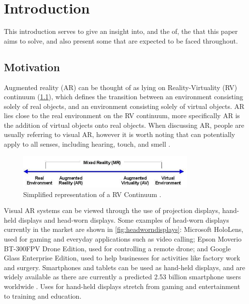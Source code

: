 
\chapter{Introduction}\label{chap:introduction}

This introduction serves to give an insight into, and the  of, the  that this paper aims to solve, and also present some  that are expected to be faced throughout.

\section{Motivation}\label{sec:motivation}

Augmented reality (AR) can be thought of as lying on  Reality-Virtuality (RV) continuum (\cref{fig:continuum}), which defines the transition between an environment consisting solely of real objects, and an environment consisting solely of virtual objects.  AR lies close to the real environment on the RV continuum, more specifically AR is the addition of virtual objects onto real objects. When discussing AR, people are usually referring to visual AR, however it is worth noting that can potentially apply to all senses, including hearing, touch, and smell \citep{aradvances}.

\begin{figure}[ht]
    \centering
    \includegraphics[width=0.8\textwidth]{images/proposal/RealityVirtualityContinuum}
    \caption{Simplified representation of a RV Continuum \protect\citep{rvcontinuum}.}
    \label{fig:continuum}
\end{figure}

Visual AR systems can be viewed through the use of projection displays, hand-held displays and head-worn displays. Some examples of head-worn displays currently in the market are shown in \cref{fig:headworndisplays}: Microsoft HoloLens, used for gaming and everyday applications such as video calling; Epson Moverio BT-300FPV Drone Edition, used for controlling a remote drone; and Google Glass Enterprise Edition, used to help businesses for activities like factory work and surgery. Smartphones and tablets can be used as hand-held displays, and are widely available as there are currently a predicted 2.53 billion smartphone users worldwide \citep{emarketer}. Uses for hand-held displays stretch from gaming and entertainment to training and education.


